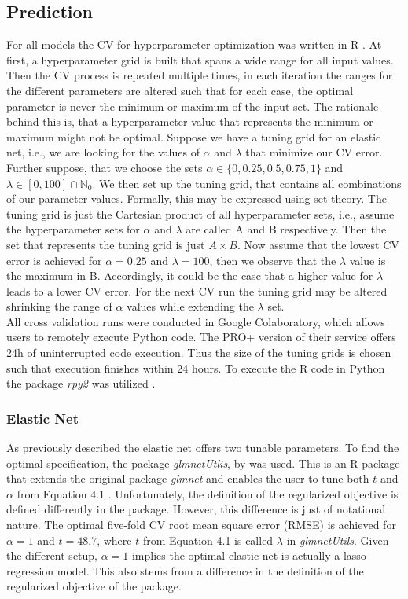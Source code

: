 \documentclass[a4paper,12pt, headsepline]{scrartcl}
\numberwithin{equation}{section}
\begin{document}
\subsection{Prediction}\label{subsec:pred}
For all models the CV for hyperparameter optimization was written in R \citep{R}. At first, a hyperparameter grid is built that spans a wide range for all input values. Then the CV process is repeated multiple times, in each iteration the ranges for the different parameters are altered such that for each case, the optimal parameter is never the minimum or maximum of the input set. The rationale behind this is, that a hyperparameter value that represents the minimum or maximum might not be optimal. Suppose we have a tuning grid for an elastic net, i.e., we are looking for the values of $\alpha$ and $\lambda$ that minimize our CV error. Further suppose, that we choose the sets $\alpha \in \{0, 0.25, 0.5, 0.75, 1\}$ and $\lambda \in [0, 100] \cap \mathbb{N}_0$. We then set up the tuning grid, that contains all combinations of our parameter values. Formally, this may be expressed using set theory. The tuning grid is just the Cartesian product of all hyperparameter sets, i.e., assume the hyperparameter sets for $\alpha$ and $\lambda$ are called A and B respectively. Then the set that represents the tuning grid is just $A \times B$. Now assume that the lowest CV error is achieved for $\alpha = 0.25$ and $\lambda = 100$, then we observe that the $\lambda$ value is the maximum in B. Accordingly, it could be the case that a higher value for $\lambda$ leads to a lower CV error. For the next CV run the tuning grid may be altered shrinking the range of $\alpha$ values while extending the $\lambda$ set.\\
All cross validation runs were conducted in Google Colaboratory, which allows users to remotely execute Python code. The PRO+ version of their service offers 24h of uninterrupted code execution. Thus the size of the tuning grids is chosen such that execution finishes within 24 hours. To execute the R code in Python the package \textit{rpy2} was utilized \citep{rpy2}.

\subsubsection{Elastic Net}
As previously described the elastic net offers two tunable parameters. To find the optimal specification, the package \textit{glmnetUtlis}, by \citet{glmnetUtils} was used. This is an R package that extends the original package \textit{glmnet} and enables the user to tune both $t$ and $\alpha$ from Equation 4.1 \citep{glmnet}. Unfortunately, the definition of the regularized objective is defined differently in the package. However, this difference is just of notational nature. The optimal five-fold CV root mean square error (RMSE) is achieved for $\alpha = 1$ and $t = 48.7$, where $t$ from Equation 4.1 is called $\lambda$ in \textit{glmnetUtils}. Given the different setup, $\alpha = 1$ implies the optimal elastic net is actually a lasso regression model. This also stems from a difference in the definition of the regularized objective of the package. 
\end{document}
